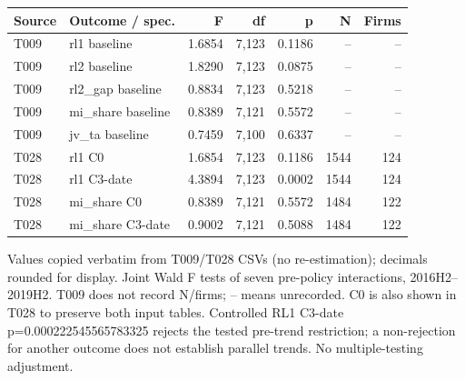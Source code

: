 \begingroup\scriptsize\setlength{\tabcolsep}{3pt}
\begin{threeparttable}
\begin{tabular}{llrrrrr}
\toprule
Source & Outcome / spec. & F & df & p & N & Firms \\
\midrule
T009 & rl1 baseline & 1.6854 & 7,123 & 0.1186 & -- & -- \\
T009 & rl2 baseline & 1.8290 & 7,123 & 0.0875 & -- & -- \\
T009 & rl2\_gap baseline & 0.8834 & 7,123 & 0.5218 & -- & -- \\
T009 & mi\_share baseline & 0.8389 & 7,121 & 0.5572 & -- & -- \\
T009 & jv\_ta baseline & 0.7459 & 7,100 & 0.6337 & -- & -- \\
T028 & rl1 C0 & 1.6854 & 7,123 & 0.1186 & 1544 & 124 \\
T028 & rl1 C3-date & 4.3894 & 7,123 & 0.0002 & 1544 & 124 \\
T028 & mi\_share C0 & 0.8389 & 7,121 & 0.5572 & 1484 & 122 \\
T028 & mi\_share C3-date & 0.9002 & 7,121 & 0.5088 & 1484 & 122 \\
\bottomrule
\end{tabular}
\begin{tablenotes}[flushleft]\footnotesize
\item[] Values copied verbatim from T009/T028 CSVs (no re-estimation); decimals rounded for display. Joint Wald F tests of seven pre-policy interactions, 2016H2--2019H2. T009 does not record N/firms; -- means unrecorded. C0 is also shown in T028 to preserve both input tables. Controlled RL1 C3-date p=0.000222545565783325 rejects the tested pre-trend restriction; a non-rejection for another outcome does not establish parallel trends. No multiple-testing adjustment.
\end{tablenotes}
\end{threeparttable}
\endgroup
\par\medskip
